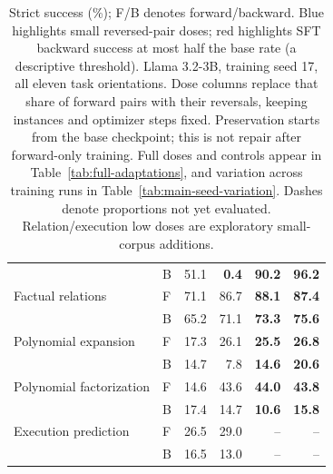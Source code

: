 \begin{table}[!t]
\begin{tabular}{llrrrr}
 & B & 51.1 & \textcolor{red!70!black}{\textbf{0.4}} & \textcolor{blue!60!black}{\textbf{90.2}} & \textcolor{blue!60!black}{\textbf{96.2}} \\
\addlinespace[2pt]
Factual relations & F & 71.1 & 86.7 & \textcolor{blue!60!black}{\textbf{88.1}} & \textcolor{blue!60!black}{\textbf{87.4}} \\
 & B & 65.2 & 71.1 & \textcolor{blue!60!black}{\textbf{73.3}} & \textcolor{blue!60!black}{\textbf{75.6}} \\
\addlinespace[2pt]
Polynomial expansion & F & 17.3 & 26.1 & \textcolor{blue!60!black}{\textbf{25.5}} & \textcolor{blue!60!black}{\textbf{26.8}} \\
 & B & 14.7 & 7.8 & \textcolor{blue!60!black}{\textbf{14.6}} & \textcolor{blue!60!black}{\textbf{20.6}} \\
\addlinespace[2pt]
Polynomial factorization & F & 14.6 & 43.6 & \textcolor{blue!60!black}{\textbf{44.0}} & \textcolor{blue!60!black}{\textbf{43.8}} \\
 & B & 17.4 & 14.7 & \textcolor{blue!60!black}{\textbf{10.6}} & \textcolor{blue!60!black}{\textbf{15.8}} \\
\addlinespace[2pt]
Execution prediction & F & 26.5 & 29.0 & -- & -- \\
 & B & 16.5 & 13.0 & -- & -- \\
\bottomrule
\end{tabular}
\caption{Strict success (\%); F/B denotes forward/backward. Blue highlights small reversed-pair doses; red highlights SFT backward success at most half the base rate (a descriptive threshold). Llama 3.2-3B, training seed 17, all eleven task orientations. Dose columns replace that share of forward pairs with their reversals, keeping instances and optimizer steps fixed. Preservation starts from the base checkpoint; this is not repair after forward-only training. Full doses and controls appear in Table~\ref{tab:full-adaptations}, and variation across training runs in Table~\ref{tab:main-seed-variation}. Dashes denote proportions not yet evaluated. Relation/execution low doses are exploratory small-corpus additions.}\label{tab:main-adaptations}
\end{table}
